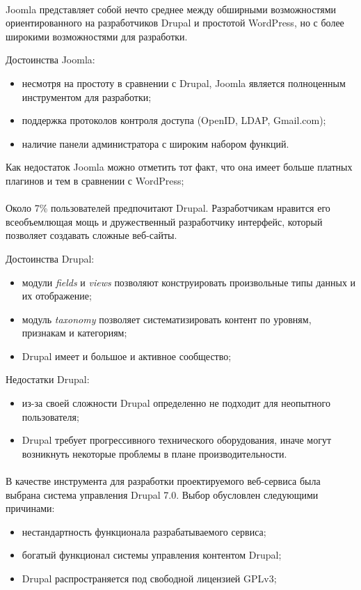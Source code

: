 \paragraph{} 
Joomla представляет собой нечто среднее между обширными возможностями
ориентированного на разработчиков Drupal и простотой WordPress,
но с более широкими возможностями для разработки.

Достоинства Joomla:
\begin{itemize}
\item
  несмотря на простоту в сравнении с Drupal, Joomla является полноценным инструментом для разработки;
\item
  поддержка протоколов контроля доступа (OpenID, LDAP, Gmail.com);
\item
  наличие панели администратора с широким набором функций.
\end{itemize}

Как недостаток Joomla можно отметить тот факт, что она имеет
больше платных плагинов и тем в сравнении с WordPress;

\paragraph{}
Около 7\% пользователей предпочитают Drupal. Разработчикам нравится его всеобъемлющая мощь
и дружественный разработчику интерфейс, который позволяет создавать сложные веб-сайты.

Достоинства Drupal:
\begin{itemize}
\item
  модули \textit{fields} и \textit{views} позволяют конструировать произвольные типы данных и их отображение;
\item
  модуль \textit{taxonomy} позволяет систематизировать контент по уровням, признакам и категориям;
\item
  Drupal имеет и большое и активное сообщество;
\end{itemize}

Недостатки Drupal:
\begin{itemize}
\item 
  из-за своей сложности Drupal определенно не подходит для неопытного пользователя;
\item
  Drupal требует прогрессивного технического оборудования,
  иначе могут возникнуть некоторые проблемы в плане производительности.
\end{itemize}

\paragraph{}
В качестве инструмента для разработки проектируемого веб-сервиса была выбрана система управления Drupal 7.0.
Выбор обусловлен следующими причинами:
\begin{itemize}
\item
  нестандартность функционала разрабатываемого сервиса;
\item
  богатый функционал системы управления контентом Drupal;
\item 
  Drupal распространяется под свободной лицензией GPLv3;
\end{itemize}  

